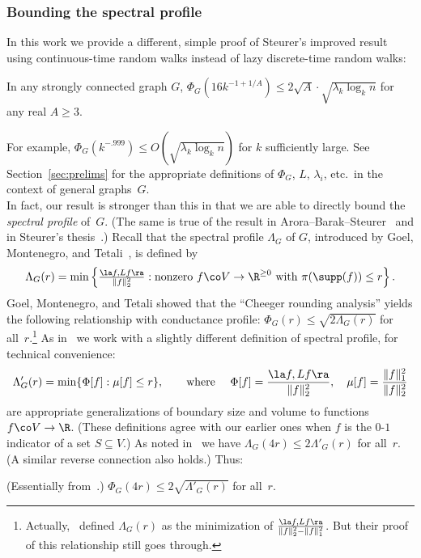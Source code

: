 \documentclass[11pt]{article}
\newcommand{\Bdry}{\Phi}
\begin{document}
\subsubsection{Bounding the spectral profile}
In this work we provide a different, simple proof of Steurer's improved result using continuous-time random walks instead of lazy discrete-time random walks:
\begin{theorem} \label{thm:our-conductance-profile}
    In any strongly connected graph $G$, $\Phi_G(16 k^{-1+1/A}) \leq 2\sqrt{A} \cdot \sqrt{\lambda_k \log_k n}$ for any real $A \geq 3$.
\end{theorem}
\noindent For example, $\Phi_G(k^{-.999}) \leq O(\sqrt{\lambda_k \log_k n})$ for $k$ sufficiently large.  See Section~\ref{sec:prelims} for the appropriate definitions of $\Phi_G$, $L$, $\lambda_i$, etc.\ in the context of general graphs~$G$.\\

In fact, our result is stronger than this in that we are able to directly bound the \emph{spectral profile} of~$G$.  (The same is true of the result in Arora--Barak--Steurer~\cite{ABS10} and in Steurer's thesis~\cite{Ste10a}.)  Recall that the spectral profile $\Lambda_G$ of $G$, introduced by Goel, Montenegro, and Tetali~\cite{GMT06}, is defined by
\[
    \Lambda_G(r) = \min \left\{ \tfrac{\la f, L f\ra}{\|f\|_2^2} : \text{nonzero } f \co V \to \R^{\geq 0} \text{ with } \pi(\supp(f)) \leq r\right\}.
\]
Goel, Montenegro, and Tetali showed that the ``Cheeger rounding analysis'' yields the following relationship with conductance profile: $\Phi_G(r) \leq \sqrt{2\Lambda_G(r)}$ for all~$r$.\footnote{Actually,~\cite{GMT06} defined $\Lambda_G(r)$ as the minimization of $\tfrac{\la f, L f\ra}{\|f\|_2^2 - \|f\|_1^2}$. But their proof of this relationship still goes through.} As in~\cite{ABS10} we work with a slightly different definition of spectral profile, for technical convenience:
\[
    \Lambda'_G(r) = \min \{ \Bdry[f] : \mu[f] \leq r \}, \qquad \text{where } \quad
    \Bdry[f] = \frac{\la f, L f\ra}{\|f\|_2^2}, \quad \mu[f] = \frac{\|f\|_1^2}{\|f\|_2^2}
\]
are appropriate generalizations of boundary size and volume to functions $f \co V \to \R$.  (These definitions agree with our earlier ones when $f$ is the $0$-$1$ indicator of a set $S \subseteq V$.)  As noted in~\cite[Lemma~A.2]{ABS10} we have $\Lambda_G(4r) \leq 2 \Lambda'_G(r)$ for all~$r$.  (A similar reverse connection also holds.)  Thus:
\begin{theorem} \label{thm:GMT} (Essentially from~\cite{GMT06}.) $\Phi_G(4r) \leq 2\sqrt{\Lambda'_G(r)}$ for all~$r$.
\end{theorem}
\end{document}
